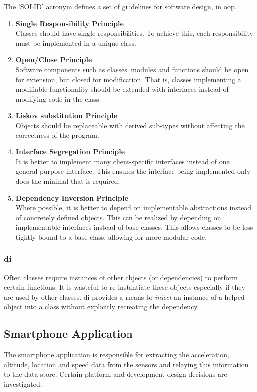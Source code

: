 The 'SOLID' acronym defines a set of guidelines for software design, in \ac{oop}.
\begin{enumerate}
\item \textbf{Single Responsibility Principle}\\
Classes should have single responsibilities. 
To achieve this, each responsibility must be implemented in a unique class.
\item \textbf{Open/Close Principle}\\
Software components such as classes, modules and functions should be open for extension, but closed for modification.
That is, classes implementing a modifiable functionality should be extended with interfaces instead of modifying code in the class.
\item \textbf{Liskov substitution Principle}\\
Objects should be replaceable with derived sub-types without affecting the correctness of the program.
\item \textbf{Interface Segregation Principle}\\
It is better to implement many client-specific interfaces instead of one general-purpose interface.
This ensures the interface being implemented only does the minimal that is required.
\item \textbf{Dependency Inversion Principle}\\
Where possible, it is better to depend on implementable abstractions instead of concretely defined objects.
This can be realized by depending on implementable interfaces instead of base classes.
This allows classes to be less tightly-bound to a base class, allowing for more modular code.
\end{enumerate}
\cite{chebanyuk2016approach}

\subsubsection{\Ac{di}}
Often classes require instances of other objects (or dependencies) to perform certain functions.
It is wasteful to re-instantiate these objects especially if they are used by other classes.
\Ac{di} provides a means to \textit{inject} an instance of a helped object into a class without explicitly recreating the dependency.
\cite{kocsis2017dependency}

\subsection{Smartphone Application}
The smartphone application is responsible for extracting the acceleration, altitude, location and speed data from the sensors and relaying this information to the data store.
Certain platform and development design decisions are investigated.


